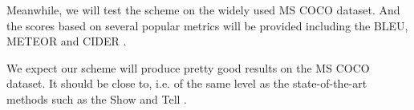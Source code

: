 \documentclass[conference]{IEEEtran}
\begin{document}
Meanwhile, we will test the scheme on the widely used MS COCO dataset. And the scores based on several popular metrics will be provided including the BLEU, METEOR and CIDER \cite{vedantam2015cider}.

We expect our scheme will produce pretty good results on the MS COCO dataset. It should be close to, i.e. of the same level as the state-of-the-art methods such as the Show and Tell \cite{vinyals2015show}.





\end{document}
